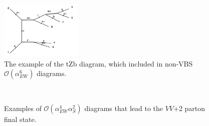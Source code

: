 \begin{figure}[tbp]
\begin{center}
\includegraphics[width=0.35\textwidth]{figures/samples/feynEWKnonVBStZb.pdf}
\caption{
The example of the tZb diagram, which included in non-VBS $\mathcal{O}(\alpha_{EW}^6)$ diagrams. 
}
\label{fig:feynmantZb}
\end{center}
\end{figure}
%
\begin{figure}[tbp]
\begin{center}
\\
\caption{
Examples of $\mathcal{O}(\alpha_{EW}^4 \alpha_{S}^2)$ diagrams that lead to the $VV$+2 parton final state. 
}
\label{fig:feynmanQCD}
\end{center}
\end{figure}

